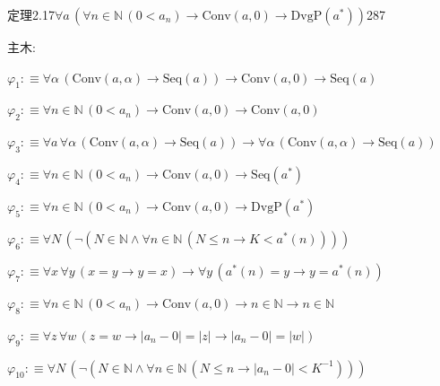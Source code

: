 \begin{fullproof}{定理2.17}{$\forall a\,(\forall n \in \mathbb{N}\,(0 < a_{n}) \to \mathrm{Conv}(a,0) \to \mathrm{DvgP}(a^{\ast}))$}{287}
\begin{ptree}
\noLine
{}
\noLine
{}
\end{ptree}
\noindent 主木:
\begin{ptree}
\noLine
{}
\noLine
{}
\end{ptree}
\begin{abbrevlist}
\item $\varphi_{1} :\equiv \forall \alpha\,(\mathrm{Conv}(a,\alpha) \to \mathrm{Seq}(a)) \to \mathrm{Conv}(a,0) \to \mathrm{Seq}(a)$
\item $\varphi_{2} :\equiv \forall n \in \mathbb{N}\,(0 < a_{n}) \to \mathrm{Conv}(a,0) \to \mathrm{Conv}(a,0)$
\item $\varphi_{3} :\equiv \forall a\,\forall \alpha\,(\mathrm{Conv}(a,\alpha) \to \mathrm{Seq}(a)) \to \forall \alpha\,(\mathrm{Conv}(a,\alpha) \to \mathrm{Seq}(a))$
\item $\varphi_{4} :\equiv \forall n \in \mathbb{N}\,(0 < a_{n}) \to \mathrm{Conv}(a,0) \to \mathrm{Seq}(a^{\ast})$
\item $\varphi_{5} :\equiv \forall n \in \mathbb{N}\,(0 < a_{n}) \to \mathrm{Conv}(a,0) \to \mathrm{DvgP}(a^{\ast})$
\item $\varphi_{6} :\equiv \forall N\,(\neg (N \in \mathbb{N} \land \forall n \in \mathbb{N}\,(N \leq n \to K < a^{\ast}(n))))$
\item $\varphi_{7} :\equiv \forall x\,\forall y\,(x = y \to y = x) \to \forall y\,(a^{\ast}(n) = y \to y = a^{\ast}(n))$
\item $\varphi_{8} :\equiv \forall n \in \mathbb{N}\,(0 < a_{n}) \to \mathrm{Conv}(a,0) \to n \in \mathbb{N} \to n \in \mathbb{N}$
\item $\varphi_{9} :\equiv \forall z\,\forall w\,(z = w \to \lvert a_{n} - 0 \rvert = \lvert z \rvert \to \lvert a_{n} - 0 \rvert = \lvert w \rvert)$
\item $\varphi_{10} :\equiv \forall N\,(\neg (N \in \mathbb{N} \land \forall n \in \mathbb{N}\,(N \leq n \to \lvert a_{n} - 0 \rvert < K^{-1})))$

\end{abbrevlist}
\end{fullproof}
